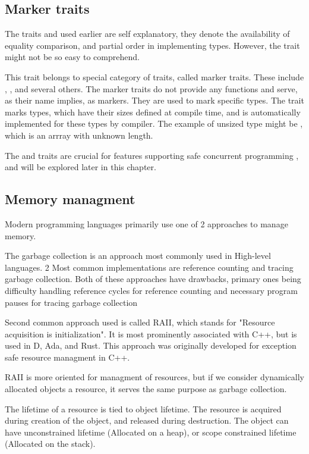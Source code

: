 \subsection{Marker traits}
The traits  and  used earlier are self explanatory, they denote the availability of equality comparison, and partial order
in implementing types. However, the  trait might not be so easy to comprehend.

This trait belongs to special category of traits, called marker traits. These include  , ,  and several others.
The marker traits do not provide any functions and serve, as their name implies, as markers. They are used to mark specific
types. The  trait marks types, which have their sizes defined at compile time, and is automatically implemented
for these types by compiler. The example of unsized type might be \type{[u8]} , which is an arrray with unknown length.

The  and  traits are crucial for features supporting safe concurrent programming , and will be explored later in
this chapter.

\subsection{Memory managment}
Modern programming languages primarily use one of 2 approaches to manage memory.

The garbage collection is an approach most commonly used in High-level languages. 2 Most common implementations
are reference counting and tracing garbage collection. Both of these approaches have drawbacks, primary ones being
difficulty handling reference cycles for reference counting and necessary program pauses for tracing garbage collection

Second common approach used is called RAII, which stands for "Resource acquisition is initialization". It is most
prominently associated with C++, but is used in D, Ada, and Rust. This approach was originally developed for exception safe
resource managment in C++\cite{stroustrup2015brief}.

RAII is more oriented for managment of resources, but if we consider dynamically allocated objects a resource, it serves
the same purpose as garbage collection.

The lifetime of a resource is tied to object lifetime. The resource is acquired during creation of the object,
and released during destruction. The object can have unconstrained lifetime (Allocated on a heap), or scope constrained
lifetime (Allocated on the stack).

